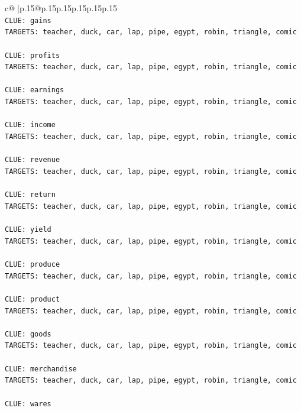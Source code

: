 \documentclass{article}
\begin{document}
{\begin{supertabular}{c@{$\;$}|p{.15\linewidth}@{}p{.15\linewidth}p{.15\linewidth}p{.15\linewidth}p{.15\linewidth}p{.15\linewidth}}
{{{\\ 
\texttt{CLUE: gains} \\
\texttt{TARGETS: teacher, duck, car, lap, pipe, egypt, robin, triangle, comic} \\
\\ 
\texttt{CLUE: profits} \\
\texttt{TARGETS: teacher, duck, car, lap, pipe, egypt, robin, triangle, comic} \\
\\ 
\texttt{CLUE: earnings} \\
\texttt{TARGETS: teacher, duck, car, lap, pipe, egypt, robin, triangle, comic} \\
\\ 
\texttt{CLUE: income} \\
\texttt{TARGETS: teacher, duck, car, lap, pipe, egypt, robin, triangle, comic} \\
\\ 
\texttt{CLUE: revenue} \\
\texttt{TARGETS: teacher, duck, car, lap, pipe, egypt, robin, triangle, comic} \\
\\ 
\texttt{CLUE: return} \\
\texttt{TARGETS: teacher, duck, car, lap, pipe, egypt, robin, triangle, comic} \\
\\ 
\texttt{CLUE: yield} \\
\texttt{TARGETS: teacher, duck, car, lap, pipe, egypt, robin, triangle, comic} \\
\\ 
\texttt{CLUE: produce} \\
\texttt{TARGETS: teacher, duck, car, lap, pipe, egypt, robin, triangle, comic} \\
\\ 
\texttt{CLUE: product} \\
\texttt{TARGETS: teacher, duck, car, lap, pipe, egypt, robin, triangle, comic} \\
\\ 
\texttt{CLUE: goods} \\
\texttt{TARGETS: teacher, duck, car, lap, pipe, egypt, robin, triangle, comic} \\
\\ 
\texttt{CLUE: merchandise} \\
\texttt{TARGETS: teacher, duck, car, lap, pipe, egypt, robin, triangle, comic} \\
\\ 
\texttt{CLUE: wares} \\
}}}
\end{supertabular}}
\end{document}
